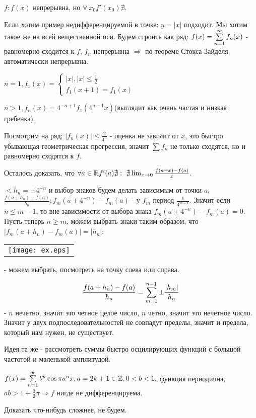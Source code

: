 \documentclass[12pt]{report}
\begin{document}
\begin{ex}
$f: f(x)$ непрерывна, но $\forall ~x_0 f'(x_0) \nexists$. 

Если хотим пример недифференцируемой в точке: $y = |x|$ подходит. Мы хотим такое же на всей вещественной оси. Будем строить как ряд: $f(x) = \sum\limits_{n = 1}^\infty{f_n(x)}$ - равномерно сходится к $f$, $f_n$ непрерывна $\Rightarrow$ по теореме Стокса-Зайделя автоматически непрерывна. 

$n = 1, f_1(x) = 
\left\{
\begin{matrix}
|x|, |x| \le \frac{1}{2}\\
f_1(x + 1) = f_1(x) 
\end{matrix}\right.
$

$n > 1, f_n(x) = 4^{-n + 1}f_1(4^{n - 1}x)$(выглядит как очень частая и низкая гребенка).

Посмотрим на ряд; $|f_n(x)| \le \frac{2}{4^n}$ - оценка не завиcит от $x$, это быстро убывающая геометрическая прогрессия, значит $\sum{f_n}$ не только сходятся, но и равномерно сходятся к $f$.

Осталось доказать, что $\forall a \in \mathbb{R} f'(a) \nexists: ~\nexists \lim_{x \to 0}{\frac{f(a + x) - f(a)}{x}}$.

$\lessdot h_n = \pm 4^{-n}$ и выбор знаков будем делать зависимым от точки $a$; $\frac{f(a + h_n) - f(a)}{h_n}; f_m(a \pm 4^{-n}) - f_m(a)$ - у $f_m$ период $\frac{1}{4^{m - 1}}$. Значит если $n \le m - 1$, то вне зависимости от выбора знака $f_m(a \pm 4^{-n}) - f_m(a) = 0$. Пусть теперь $n \ge m$, можем выбрать знаки таким образом, что $|f_m(a + h_n) - f_m(a)| = |h_n|$:
\begin{center}
\begin{tabular}{c}
\texttt{[image: ex.eps]}\\
\end{tabular}
\end{center}
 - можем выбрать, посмотреть на точку слева или справа.

$$\frac{f(a + h_n) - f(a)}{h_n} = \sum\limits_{m = 1}^{n - 1}{\pm\frac{|h_m|}{h_n}}$$
 - $n$ нечетно, значит это четное целое число, $n$ четно, значит это нечетное число. Значит у двух подпоследовательностей не совпадут пределы, значит и предела, который нам нужен, не существует.
\end{ex}

\begin{ex}

Идея та же - рассмотреть суммы быстро осцилирующих функций с большой частотой и маленькой амплитудой.

$f(x) = \sum\limits_{n = 1}^\infty{b^n\cos{\pi a^nx}}, a = 2k + 1 \in \mathbb{Z}, 0 < b < 1,$ функция периодична, $ab > 1 + \frac{3}{2}\pi \Rightarrow f$ нигде не дифференцируема.

Доказать что-нибудь сложнее, не будем.
\end{ex}
\end{document}
